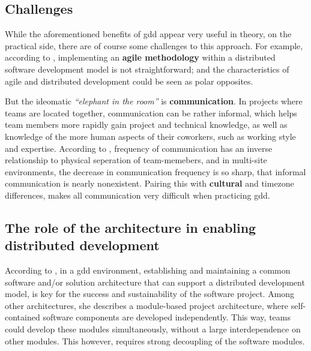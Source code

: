 \subsection{Challenges}

While the aforementioned benefits of \gls{gdd} appear very useful in theory, on
the practical side, there are of course some challenges to this approach. For
example, according to \textcite{Smite_etal_2010}, implementing an \textbf{agile
methodology} within a distributed software development model is not
straightforward; and the characteristics of agile and distributed development
could be seen as polar opposites. 

But the ideomatic \textit{``elephant in the room''} is \textbf{communication}.
In projects where teams are located together, communication can be rather
informal, which helps team members more rapidly gain project and technical
knowledge, as well as knowledge of the more human aspects of their coworkers,
such as working style and expertise. According to \textcite{Sengupta_2006},
frequency of communication has an inverse relationship to physical seperation of
team-memebers, and in multi-site environments, the decrease in communication
frequency is so sharp, that informal communication is nearly nonexistent.
Pairing this with \textbf{cultural} and timezone differences, makes all
communication very difficult when practicing \gls{gdd}.


\subsection{The role of the architecture in enabling distributed development}

According to \textcite{Yuhong_2008}, in a \gls{gdd} environment, establishing
and maintaining a common software and/or solution architecture that can support
a distributed development model, is key for the success and sustainability of
the software project. Among other architectures, she describes a module-based
project architecture, where self-contained software components are developed
independently. This way, teams could develop these modules simultaneously,
without a large interdependence on other modules. This however, requires strong
decoupling of the software modules.